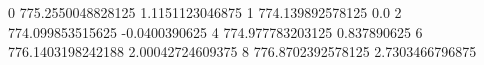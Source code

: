 0 775.2550048828125 1.1151123046875
1 774.139892578125 0.0
2 774.099853515625 -0.0400390625
4 774.977783203125 0.837890625
6 776.1403198242188 2.00042724609375
8 776.8702392578125 2.7303466796875
